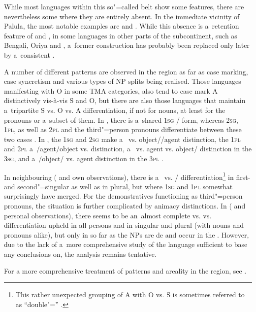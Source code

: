 While most languages within this so"=called  belt show some  features, there are nevertheless some where they are entirely absent. In the immediate vicinity of Palula, the most notable examples are \iliKalasha and \iliKhowar \citep[41]{bashir1988}. While this absence is a~retention feature of \iliKalasha and \iliKhowar, in some languages in other parts of the subcontinent, such as Bengali, Oriya and \iliSinhalese, a~former  construction has probably been replaced only later by a~consistent   \citep[343--344]{masica1991}.



A number of different patterns are observed in the region as far as case marking, case syncretism and various types of NP splits being realised. Those languages manifesting  with O in some TMA categories, also tend to case mark A distinctively vis-à-vis S and O, but there are also those languages that maintain a~tripartite S vs. O vs. A differentiation, if not for nouns, at least for the pronouns or a~subset of them. In \iliPunjabi, there is a~shared \textsc{1sg} / form, whereas \textsc{2sg}, \textsc{1pl}, as well as \textsc{2pl} and the third"=person pronouns differentiate between these two cases \citep[229]{bhatia1993}. In \iliGawri, the \textsc{1sg} and \textsc{2sg} make a~ vs. object//agent distinction, the \textsc{1pl} and \textsc{2pl} a~/agent/object vs.  distinction, a~ vs. agent vs. object/ distinction in the \textsc{3sg}, and a~/object/ vs. agent distinction in the \textsc{3pl} \citep[39]{baart1999a}. 



In neighbouring \iliDameli (\citealt{morgenstierne1942} and own observations), there is a~ vs. / differentiation\footnote{This rather unexpected grouping of A with O vs. S is sometimes referred to as ``double"='' \citep{payne1980}.} in first- and second"=singular as well as in plural, but where \textsc{1sg} and \textsc{1pl}  somewhat surprisingly have merged. For the demonstratives functioning as third"=person pronouns, the situation is further complicated by animacy distinctions. In \iliGawarbati (\citealt{morgenstierne1950} and personal observations), there seems to be an~almost complete  vs.  vs.  differentiation upheld in all persons and in singular and plural (with nouns and pronouns alike), but only in so far as the NPs are de and occur in the . However, due to the lack of a~more comprehensive study of the language sufficient to base any conclusions on, the analysis remains tentative. 
 

For a more comprehensive treatment of  patterns and areality in the region, see \citet{liljegren2014}. 